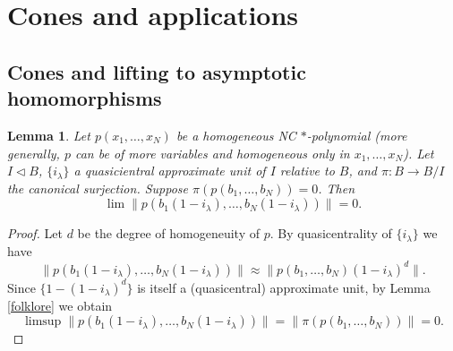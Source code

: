 \documentclass{article}%
\newtheorem{lemma}[theorem]{Lemma}
\begin{document}
\section{Cones and applications}

\subsection{Cones and lifting to asymptotic homomorphisms}





\begin{lemma}\label{AsHom1}  Let $p (x_1, \ldots, x_N) $ be a homogeneous NC $\ast$-polynomial (more generally, $p$ can be of more variables and homogeneous only in $x_1, \ldots, x_N$). Let $I \lhd B$, $\{i_{\lambda}\}$ a quasicientral approximate unit of $I$ relative to $B$, and $\pi: B \to B/I$  the canonical surjection.
 Suppose $\pi(p(b_1, \ldots, b_N)) = 0$. Then $$\lim \|p(b_1(1-i_{\lambda}), \ldots, b_N(1-i_{\lambda}))\| =0.$$
\end{lemma}
\begin{proof} Let $d$ be the degree of homogeneuity of $p$. By quasicentrality of  $\{i_{\lambda}\}$ we have $$ \|p(b_1(1-i_{\lambda}), \ldots, b_N(1-i_{\lambda}))\| \approx \|p(b_1, \ldots, b_N) (1- i_{\lambda})^d\|.$$ Since $\{ 1- (1- i_{\lambda})^d\}$ is itself a (quasicentral) approximate unit, by Lemma \ref{folklore}  we obtain
$$\limsup \|p(b_1(1-i_{\lambda}), \ldots, b_N(1-i_{\lambda}))\| = \| \pi(p(b_1, \ldots, b_N)) \| =0.$$
\end{proof}

\end{document}
